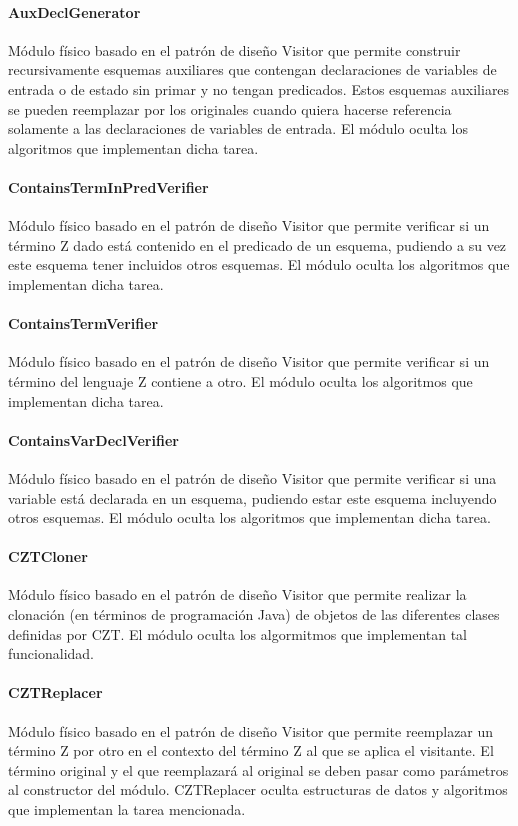 \documentclass[a4paper,10pt]{report}
\begin{document}
				\paragraph{AuxDeclGenerator}
				Módulo físico basado en el patrón de diseño Visitor que permite construir recursivamente esquemas auxiliares que contengan declaraciones de variables de entrada o de estado sin primar y no tengan predicados. Estos esquemas auxiliares se pueden reemplazar por los originales cuando quiera hacerse referencia solamente a las declaraciones de variables de entrada. El módulo oculta los algoritmos que implementan dicha tarea.
				\paragraph{ContainsTermInPredVerifier}
				Módulo físico basado en el patrón de diseño Visitor que permite verificar si un término Z dado está contenido en el predicado de un esquema, pudiendo a su vez este esquema tener incluidos otros esquemas. El módulo oculta los algoritmos que implementan dicha tarea.				
				\paragraph{ContainsTermVerifier}
				Módulo físico basado en el patrón de diseño Visitor que permite verificar si un término del lenguaje Z contiene a otro. El módulo oculta los algoritmos que implementan dicha tarea.
				\paragraph{ContainsVarDeclVerifier}
				Módulo físico basado en el patrón de diseño Visitor que permite verificar si una variable está declarada en un esquema, pudiendo estar este esquema incluyendo otros esquemas. El módulo oculta los algoritmos que implementan dicha tarea.				
				\paragraph{CZTCloner}
				Módulo físico basado en el patrón de diseño Visitor que permite realizar la clonación (en términos de programación Java) de objetos de las diferentes clases definidas por CZT. El módulo oculta los algormitmos que implementan tal funcionalidad.
				\paragraph{CZTReplacer}
				Módulo físico basado en el patrón de diseño Visitor que permite reemplazar un término Z por otro en el contexto del término Z al que se aplica el visitante. El término original y el que reemplazará al original se deben pasar como parámetros al constructor del módulo. CZTReplacer oculta estructuras de datos y algoritmos que implementan la tarea mencionada.
\end{document}
